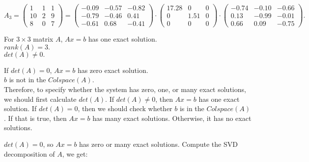 \documentclass[
  course = {{16-811 Math Fundamentals for Robotics}},
  quartile = {{1}},
  assignment = 1,
  name = {{Kangle Deng}},
  email = {{kangled@andrew.cmu.edu}},
  firstexercise = 1
]{aga-homework}
\begin{document}
\begin{equation*}
    A_3 = 
    \left(
    \begin{array}{ccc}
        1 & 1 & 1 \\
        10 & 2 & 9 \\
        8 & 0 & 7
    \end{array}
    \right) =
    \left(
    \begin{array}{ccc}
        -0.09 & -0.57 & -0.82 \\
        -0.79 & -0.46 & 0.41 \\
        -0.61 & 0.68 & -0.41
    \end{array}
    \right) \cdot
    \left(
    \begin{array}{ccc}
        17.28 & 0 & 0 \\
        0 & 1.51 & 0 \\
        0 & 0 & 0
    \end{array}
    \right) \cdot
    \left(
    \begin{array}{ccc}
        -0.74 & -0.10 & -0.66 \\
        0.13 & -0.99 & -0.01 \\
        0.66 & 0.09 & -0.75
    \end{array}
    \right).
\end{equation*}

\exercise
For $3\times 3$ matrix $A$, $Ax=b$ has one exact solution. \\
\makebox[3cm]{$\Leftrightarrow$} $rank(A) = 3.$ \\
\makebox[3cm]{$\Leftrightarrow$} $det(A) \ne 0.$

\noindent If $det(A) = 0$, $Ax=b$ has zero exact solution. \\
\makebox[3cm]{$\Leftrightarrow$} $b$ is not in the $Colspace(A)$. \\

Therefore, to specify whether the system has zero, one, or many exact solutions, we should first calculate $det(A)$. If $det(A) \ne 0$, then $Ax=b$ has one exact solution. If $det(A) = 0$, then we should check whether $b$ is in the $Colspace(A)$. If that is true, then $Ax=b$ has many exact solutions. Otherwise, it has no exact solutions.

\subexercise
$det(A) = 0$, so $Ax = b$ has zero or many exact solutions.
Compute the SVD decomposition of $A$, we get:
\end{document}
